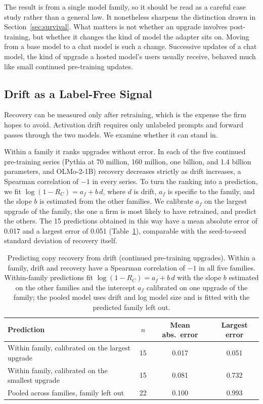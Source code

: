 \documentclass[ijds,nonblindrev]{informs4}
\begin{document}
The result is from a single model family, so it should be read as a careful case study rather than a general law. It nonetheless sharpens the distinction drawn in Section~\ref{sec:survival}. What matters is not whether an upgrade involves post-training, but whether it changes the kind of model the adapter sits on. Moving from a base model to a chat model is such a change. Successive updates of a chat model, the kind of upgrade a hosted model's users usually receive, behaved much like small continued pre-training updates.

\subsection{Drift as a Label-Free Signal}\label{sec:drift}

Recovery can be measured only after retraining, which is the expense the firm hopes to avoid. Activation drift requires only unlabeled prompts and forward passes through the two models. We examine whether it can stand in.

Within a family it ranks upgrades without error. In each of the five continued pre-training series (Pythia at 70 million, 160 million, one billion, and 1.4 billion parameters, and OLMo-2-1B) recovery decreases strictly as drift increases, a Spearman correlation of $-1$ in every series. To turn the ranking into a prediction, we fit $\log(1-R_C)=a_f+b\,d$, where $d$ is drift, $a_f$ is specific to the family, and the slope $b$ is estimated from the other families. We calibrate $a_f$ on the largest upgrade of the family, the one a firm is most likely to have retrained, and predict the others. The 15 predictions obtained in this way have a mean absolute error of 0.017 and a largest error of 0.051 (Table~\ref{tab:drift}), comparable with the seed-to-seed standard deviation of recovery itself.

\begin{table}[t]
\centering
\caption{Predicting copy recovery from drift (continued pre-training upgrades). Within a family, drift and recovery have a Spearman correlation of $-1$ in all five families. Within-family predictions fit $\log(1-R_C)=a_f+b\,d$ with the slope $b$ estimated on the other families and the intercept $a_f$ calibrated on one upgrade of the family; the pooled model uses drift and log model size and is fitted with the predicted family left out.}\label{tab:drift}
\small
\begin{tabular}{lccc}
\toprule
Prediction & $n$ & Mean abs.\ error & Largest error\\
\midrule
Within family, calibrated on the largest upgrade & 15 & 0.017 & 0.051\\
Within family, calibrated on the smallest upgrade & 15 & 0.081 & 0.732\\
Pooled across families, family left out & 22 & 0.100 & 0.993\\
\bottomrule
\end{tabular}
\end{table}
\end{document}
